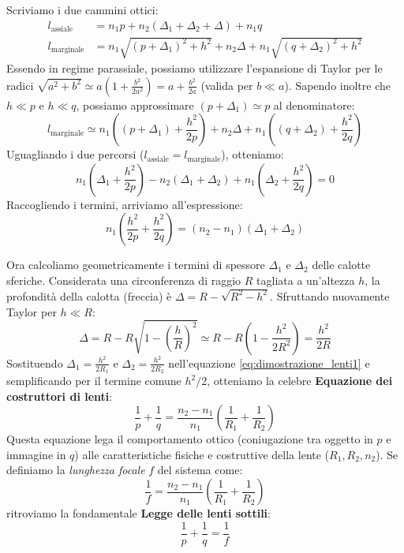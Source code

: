 \documentclass[openany,a4paper,12pt]{book}
\begin{document}
Scriviamo i due cammini ottici:
\begin{align}
     l_{\text{assiale}} &= n_1 p + n_2 (\Delta_1 + \Delta_2 + \Delta) + n_1 q \\
     l_{\text{marginale}} &= n_1 \sqrt{(p+\Delta_1)^2 + h^2} + n_2 \Delta + n_1 \sqrt{(q+\Delta_2)^2 + h^2}
\end{align}
Essendo in regime parassiale, possiamo utilizzare l'espansione di Taylor per le radici $\sqrt{a^2 + b^2} \simeq a \left(1 + \frac{b^2}{2a^2}\right) = a + \frac{b^2}{2a}$ (valida per $b \ll a$). Sapendo inoltre che $h \ll p$ e $h \ll q$, possiamo approssimare $(p+\Delta_1) \simeq p$ al denominatore:
\begin{equation}
     l_{\text{marginale}} \simeq n_1 \left( (p+\Delta_1) + \frac{h^2}{2p} \right) + n_2 \Delta + n_1 \left( (q+\Delta_2) + \frac{h^2}{2q} \right)
\end{equation}    
Uguagliando i due percorsi ($l_{\text{assiale}} = l_{\text{marginale}}$), otteniamo:
\begin{equation}
     n_1 \left( \Delta_1 + \frac{h^2}{2p} \right) - n_2 (\Delta_1 + \Delta_2) + n_1 \left( \Delta_2 + \frac{h^2}{2q} \right) = 0
\end{equation}
Raccogliendo i termini, arriviamo all'espressione:
\begin{equation}
     n_1 \left( \frac{h^2}{2p} + \frac{h^2}{2q} \right) = (n_2 - n_1) (\Delta_1 + \Delta_2)
     \label{eq:dimostrazione_lenti1}
\end{equation}  

Ora calcoliamo geometricamente i termini di spessore $\Delta_1$ e $\Delta_2$ delle calotte sferiche. Considerata una circonferenza di raggio $R$ tagliata a un'altezza $h$, la profondità della calotta (freccia) è $\Delta = R - \sqrt{R^2 - h^2}$. Sfruttando nuovamente Taylor per $h \ll R$:
\begin{equation}
    \Delta = R - R \sqrt{1 - \left(\frac{h}{R}\right)^2} \simeq R - R \left( 1 - \frac{h^2}{2R^2} \right) = \frac{h^2}{2R}
\end{equation} 
Sostituendo $\Delta_1 = \frac{h^2}{2R_1}$ e $\Delta_2 = \frac{h^2}{2R_2}$ nell'equazione \ref{eq:dimostrazione_lenti1} e semplificando per il termine comune $h^2/2$, otteniamo la celebre \textbf{Equazione dei costruttori di lenti}:
\begin{equation}
     \frac{1}{p} + \frac{1}{q} = \frac{n_2 - n_1}{n_1} \left( \frac{1}{R_1} + \frac{1}{R_2} \right)
\end{equation}
Questa equazione lega il comportamento ottico (coniugazione tra oggetto in $p$ e immagine in $q$) alle caratteristiche fisiche e costruttive della lente ($R_1, R_2, n_2$). 
Se definiamo la \textit{lunghezza focale} $f$ del sistema come: 
\begin{equation}
    \frac{1}{f} = \frac{n_2 - n_1}{n_1}\left(\frac{1}{R_1} + \frac{1}{R_2}\right)
\end{equation} 
ritroviamo la fondamentale \textbf{Legge delle lenti sottili}:
\begin{equation}
    \frac{1}{p} + \frac{1}{q} =  \frac{1}{f}
\end{equation}
\end{document}
